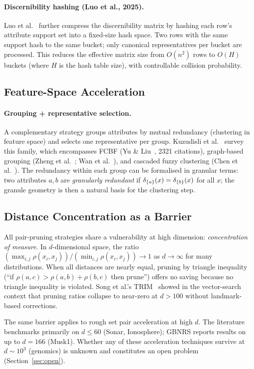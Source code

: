 \paragraph{Discernibility hashing (Luo et al., 2025).}
Luo et al.~\cite{Luo2025hash} further compress the discernibility matrix by
hashing each row's attribute support set into a fixed-size hash space.
Two rows with the same support hash to the same bucket; only canonical
representatives per bucket are processed.  This reduces the effective matrix
size from $O(n^2)$ rows to $O(H)$ buckets (where $H$ is the hash table size),
with controllable collision probability.

\subsection{Feature-Space Acceleration}
\label{sec:feat_accel}

\paragraph{Grouping + representative selection.}
A complementary strategy groups attributes by mutual redundancy (clustering in
feature space) and selects one representative per group.  Kuzudisli et
al.~\cite{Kuzudisli2023review} survey this family, which encompasses FCBF
(Yu \& Liu~\cite{YuLiu2004}, 2321 citations), graph-based grouping
(Zheng et al.~\cite{Zheng2021grouping}; Wan et al.~\cite{Wan2023TFS}), and
cascaded fuzzy clustering (Chen et al.~\cite{Chen2024cascade}).
The redundancy within each group can be formalised in granular terms:
two attributes $a, b$ are \emph{granularly redundant} if
$\delta_{\{a\}}(x) = \delta_{\{b\}}(x)$ for all $x$; the granule geometry is then
a natural basis for the clustering step.

\subsection{Distance Concentration as a Barrier}
\label{sec:concentration}

All pair-pruning strategies share a vulnerability at high dimension:
\emph{concentration of measure}.  In $d$-dimensional space, the ratio
$(\max_{i,j} \rho(x_i,x_j)) / (\min_{i,j} \rho(x_i,x_j)) \to 1$ as
$d \to \infty$ for many distributions.  When all distances are nearly equal,
pruning by triangle inequality (``if $\rho(a,c) > \rho(a,b) + \rho(b,c)$
then prune'') offers no saving because no triangle inequality is violated.
Song et al.'s TRIM~\cite{TRIM2025} showed in the vector-search context that
pruning ratios collapse to near-zero at $d > 100$ without landmark-based
corrections.

The same barrier applies to rough set pair acceleration at high $d$.
The literature benchmarks primarily on $d \leq 60$ (Sonar, Ionosphere);
GBNRS reports results on up to $d = 166$ (Musk1).  Whether any of these
acceleration techniques survive at $d \sim 10^3$ (genomics) is unknown
and constitutes an open problem (Section~\ref{sec:open}).
